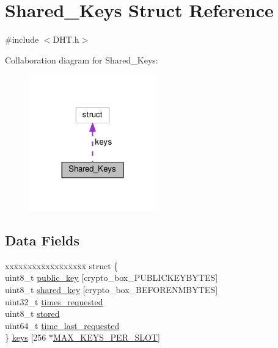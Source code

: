 \hypertarget{struct_shared___keys}{\section{Shared\+\_\+\+Keys Struct Reference}
\label{struct_shared___keys}
}


{\ttfamily \#include $<$D\+H\+T.\+h$>$}



Collaboration diagram for Shared\+\_\+\+Keys\+:
\nopagebreak
\begin{figure}[H]
\begin{center}
\leavevmode
\includegraphics[width=155pt]{d3/d3c/struct_shared___keys__coll__graph}
\end{center}
\end{figure}
\subsection*{Data Fields}
\begin{DoxyCompactItemize}
\item 
\begin{tabbing}
xx\=xx\=xx\=xx\=xx\=xx\=xx\=xx\=xx\=\kill
struct \{\\
\>uint8\_t \hyperlink{struct_shared___keys_aaa806bb1136fb3d4b5d8d8970b596ff7}{public\_key} \mbox{[}crypto\_box\_PUBLICKEYBYTES\mbox{]}\\
\>uint8\_t \hyperlink{struct_shared___keys_a81ead9fac55a0cedc30a96253a2c5119}{shared\_key} \mbox{[}crypto\_box\_BEFORENMBYTES\mbox{]}\\
\>uint32\_t \hyperlink{struct_shared___keys_ae433d486c059f93505368567603c2748}{times\_requested}\\
\>uint8\_t \hyperlink{struct_shared___keys_a252513c1d10b32b19859efae45136a75}{stored}\\
\>uint64\_t \hyperlink{struct_shared___keys_a682dfdf8b648a40e36dd5865f16da424}{time\_last\_requested}\\
\} \hyperlink{struct_shared___keys_a15077d043938aa92f7ee5278d0036f7f}{keys} \mbox{[}256 $\ast$\hyperlink{_d_h_t_8h_ae5450da86fcf09134330aeef7cd8c35f}{MAX\_KEYS\_PER\_SLOT}\mbox{]}\\

\end{tabbing}\end{DoxyCompactItemize}


